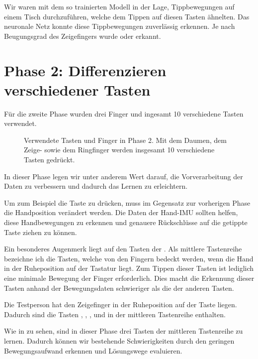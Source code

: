Wir waren mit dem so trainierten Modell in der Lage, Tippbewegungen auf einem Tisch durchzuführen, welche dem Tippen auf diesen Tasten ähnelten. Das neuronale Netz konnte diese Tippbewegungen zuverlässig erkennen. Je nach Beugungsgrad des Zeigefingers wurde  oder  erkannt.

\section{Phase 2: Differenzieren verschiedener Tasten}

Für die zweite Phase wurden drei Finger und ingesamt 10 verschiedene Tasten verwendet.

\begin{figure}[h]
    \centering
    \caption[Tasten und Finger in Phase 2]{Verwendete Tasten und Finger in Phase 2. Mit dem Daumen, dem Zeige- sowie dem Ringfinger werden insgesamt 10 verschiedene Tasten gedrückt.}
\end{figure}

In dieser Phase legen wir unter anderem Wert darauf, die Vorverarbeitung der Daten zu verbessern und dadurch das Lernen zu erleichtern.

Um zum Beispiel die Taste  zu drücken, muss im Gegensatz zur vorherigen Phase die Handposition verändert werden. Die Daten der Hand-IMU sollten helfen, diese Handbewegungen zu erkennen und genauere Rückschlüsse auf die getippte Taste ziehen zu können.

Ein besonderes Augenmerk liegt auf den Tasten der . Als mittlere Tastenreihe bezeichne ich die Tasten, welche von den Fingern bedeckt werden, wenn die Hand in der Ruheposition auf der Tastatur liegt. Zum Tippen dieser Tasten ist lediglich eine minimale Bewegung der Finger erforderlich. Dies macht die Erkennung dieser Tasten anhand der Bewegungsdaten schwieriger als die der anderen Tasten.

Die Testperson hat den Zeigefinger in der Ruheposition auf der Taste  liegen. Dadurch sind die Tasten , , ,  und \keyboard{\spacebar} in der mittleren Tastenreihe enthalten.

Wie in  zu sehen, sind in dieser Phase drei Tasten der mittleren Tastenreihe zu lernen. Dadurch können wir bestehende Schwierigkeiten durch den geringen Bewegungsaufwand erkennen und Lösungswege evaluieren.

